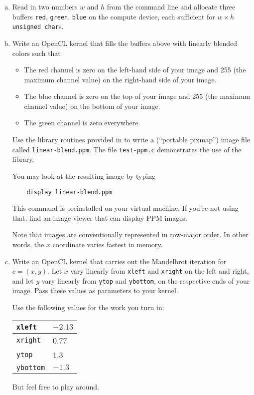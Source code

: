 \documentclass[11pt]{article}
\begin{document}
\begin{enumerate}[a)]
  \item Read in two numbers $w$ and $h$ from the command line and allocate three
    buffers \texttt{red}, \texttt{green}, \texttt{blue} on the compute
    device, each sufficient for $w\times h$ \texttt{unsigned char}s.

  \item Write an OpenCL kernel that fills the buffers above with
    linearly blended colors such that
    \begin{itemize}
      \item The red channel is zero on the left-hand side of your
        image and 255 (the maximum channel value) on the right-hand side
        of your image.
      \item The blue channel is zero on the top of your
        image and 255 (the maximum channel value) on the bottom
        of your image.
      \item The green channel is zero everywhere.
    \end{itemize}

    Use the library routines provided in
     to
    write a 
    (``portable pixmap'') image file called \texttt{linear-blend.ppm}.
    The file \texttt{test-ppm.c} demonstrates the use of the library.

    You may look at the resulting image by typing
    \begin{lstlisting}
    display linear-blend.ppm
    \end{lstlisting}

    This command is preinstalled on your virtual machine. If you're
    not using that, find an image viewer that can display PPM images.
    \label{part:mbrot-linear-blend}

    Note that images are conventionally represented in row-major
    order. In other words, the $x$ coordinate varies fastest in
    memory.

  \item Write an OpenCL kernel that carries out the Mandelbrot
    iteration for $c=(x,y)$. Let $x$ vary linearly from
    \texttt{xleft} and \texttt{xright} on the left and right, and
    let $y$ vary linearly from \texttt{ytop} and \texttt{ybottom},
    on the respective ends of your image. Pass these values as
    parameters to your kernel.

    Use the following values for the work you turn in:
    \begin{center}
      \begin{tabular}{|l|l|}
        \hline
        \texttt{xleft} & $-2.13$ \\
        \hline
        \texttt{xright} & 0.77 \\
        \hline
        \texttt{ytop} & 1.3 \\
        \hline
        \texttt{ybottom} & $-1.3$\\
        \hline
      \end{tabular}
    \end{center}
    But feel free to play around.


\end{enumerate}
\end{document}
